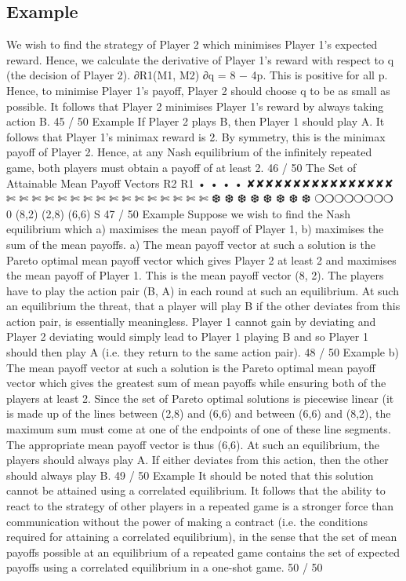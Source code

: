 \documentclass[]{report}
\begin{document}
\subsection{Example}
We wish to find the strategy of Player 2 which minimises Player 1’s
expected reward. Hence, we calculate the derivative of Player 1’s
reward with respect to q (the decision of Player 2).
∂R1(M1, M2)
∂q
= 8 − 4p.
This is positive for all p. Hence, to minimise Player 1’s payoff,
Player 2 should choose q to be as small as possible.
It follows that Player 2 minimises Player 1’s reward by always
taking action B.
45 / 50
Example
If Player 2 plays B, then Player 1 should play A.
It follows that Player 1’s minimax reward is 2. By symmetry, this is
the minimax payoff of Player 2.
Hence, at any Nash equilibrium of the infinitely repeated game,
both players must obtain a payoff of at least 2.
46 / 50
The Set of Attainable Mean Payoff Vectors
R2
R1
•
•
•
•
✘✘✘✘✘✘✘✘✘✘✘✘✘✘✘✘
✄
✄
✄
✄
✄
✄
✄
✄
✄
✄
✄
✄
✄
✄
✄
✄
❆
❆
❆
❆
❆
❆
❆
❆
❍❍❍❍❍❍❍❍
0
(8,2)
(2,8)
(6,6)
S
47 / 50
Example
Suppose we wish to find the Nash equilibrium which a) maximises
the mean payoff of Player 1, b) maximises the sum of the mean
payoffs.
a) The mean payoff vector at such a solution is the Pareto optimal
mean payoff vector which gives Player 2 at least 2 and maximises
the mean payoff of Player 1.
This is the mean payoff vector (8, 2). The players have to play the
action pair (B, A) in each round at such an equilibrium.
At such an equilibrium the threat, that a player will play B if the
other deviates from this action pair, is essentially meaningless.
Player 1 cannot gain by deviating and Player 2 deviating would
simply lead to Player 1 playing B and so Player 1 should then play
A (i.e. they return to the same action pair).
48 / 50
Example
b) The mean payoff vector at such a solution is the Pareto optimal
mean payoff vector which gives the greatest sum of mean payoffs
while ensuring both of the players at least 2.
Since the set of Pareto optimal solutions is piecewise linear (it is
made up of the lines between (2,8) and (6,6) and between (6,6)
and (8,2), the maximum sum must come at one of the endpoints
of one of these line segments.
The appropriate mean payoff vector is thus (6,6). At such an
equilibrium, the players should always play A. If either deviates
from this action, then the other should always play B.
49 / 50
Example
It should be noted that this solution cannot be attained using a
correlated equilibrium.
It follows that the ability to react to the strategy of other players
in a repeated game is a stronger force than communication
without the power of making a contract (i.e. the conditions
required for attaining a correlated equilibrium), in the sense that
the set of mean payoffs possible at an equilibrium of a repeated
game contains the set of expected payoffs using a correlated
equilibrium in a one-shot game.
50 / 50
\end{document}
